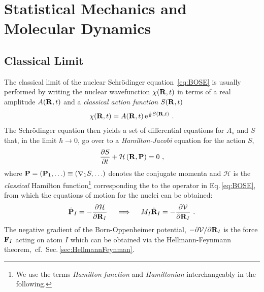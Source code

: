 \newpage

\section{Statistical Mechanics and Molecular Dynamics}
\subsection{Classical Limit}
The classical limit of the nuclear Schr\"odinger equation~\eqref{eq:BOSE} is usually performed by writing the nuclear wavefunction $\chi ({\bf R}, t)$ in terms of a real amplitude $A({\bf R}, t)$ and a \emph{classical action function} $S({\bf R}, t)$~\cite{Dirac1981,Landau2013,Marx2009}
\begin{align}
\chi({\bf R}, t) = A({\bf R}, t) \, {\rm e}^{\frac{\im}{\hbar} S({\bf R}, t)}~.
\label{eq:class.1}
\end{align}
The Schr\"odinger equation then yields a set of differential equations for $A_s$ and $S$ that, in the limit $\hbar \to 0$, go over to a \emph{Hamilton-Jacobi} equation for the action $S$,
\begin{align}
\frac{\partial S}{\partial t} + \mathcal H \left({\bf R}, {\bf P}\right)
= 0~,
\label{eq:HamiltonJacobi}
\end{align}
where ${\bf P} = ({\bf P}_1, \ldots) \equiv ({\bf \nabla}_1 S, \ldots)$ denotes the conjugate momenta and $\mathcal H$ is the \emph{classical} Hamilton function\footnote{We use the terms \emph{Hamilton function} and \emph{Hamiltonian} interchangeably in the following.} corresponding the to the operator in Eq.\,\eqref{eq:BOSE}, from which the equations of motion for the nuclei can be obtained:
\begin{align}
\dot{{\bf P}}_I 
= -\frac{\partial \mathcal H}{\partial {\bf R}_I}
\quad\implies\quad M_I \ddot{\bf R}_I
= -\frac{\partial \mathcal V}{\partial {\bf R}_I}~.
\end{align}
The negative gradient of the Born-Oppenheimer potential, 
$-\partial \mathcal V / \partial {\bf R}_I$ is the force ${\bf F}_I$ acting on atom $I$ which can be obtained via the Hellmann-Feynmann theorem,~cf.~Sec.\,\ref{sec:HellmannFeynman}.

